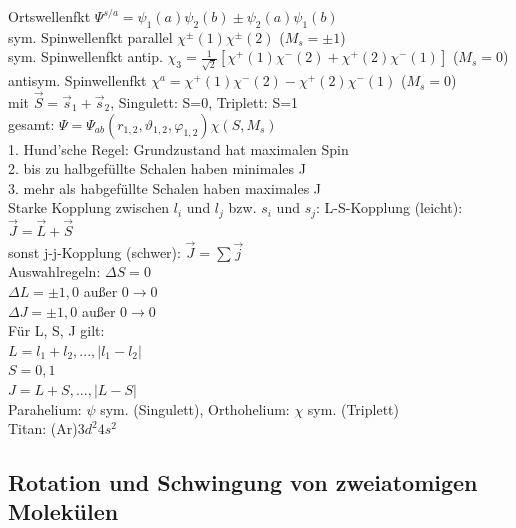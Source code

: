 \documentclass[12pt,a4paper]{article}
\renewcommand{\=}[1]{\stackrel{#1}{=}}
\theoremstyle{definition}
\theoremstyle{remark}
\begin{document}
Ortswellenfkt \dotfill $\Psi^{s/a} = \psi_1 (a) \psi_2(b) \pm \psi_2(a) \psi_1(b)$\\
sym. Spinwellenfkt parallel \dotfill $\chi^{\pm}(1) \chi^{\pm}(2)$ ($M_s = \pm 1$)\\
sym. Spinwellenfkt antip. \dotfill $ \chi_3 = \frac{1}{\sqrt{2}} [\chi^+ (1) \chi^- (2) + \chi^+ (2) \chi^- (1)]$ ($M_s = 0$)\\
antisym. Spinwellenfkt \dotfill $\chi^a = \chi^+ (1) \chi^- (2) - \chi^+ (2) \chi^- (1)$ ($M_s = 0$)\\
mit $\vec S = \vec s_1 + \vec s_2$, Singulett: S=0, Triplett: S=1\\
gesamt: $\Psi = \Psi_{ab}(r_{1,2}, \vartheta_{1,2}, \varphi_{1,2}) \chi(S,M_s)$\\
1. Hund'sche Regel: Grundzustand hat maximalen Spin\\
2. bis zu halbgefüllte Schalen haben minimales J\\
3. mehr als habgefüllte Schalen haben maximales J\\

Starke Kopplung zwischen $l_i$ und $l_j$ bzw. $s_i$ und $s_j$: L-S-Kopplung (leicht): $\vec J = \vec L + \vec S$\\
sonst j-j-Kopplung (schwer): $\vec J = \sum \vec j$\\
Auswahlregeln:
$\Delta S = 0$\\
$\Delta L = \pm 1, 0$ außer $0 \rightarrow 0$\\
$\Delta J = \pm 1, 0$ außer $0 \rightarrow 0$\\

Für L, S, J gilt:\\
$L = l_1 + l_2 , ..., |l_1 - l_2|$\\
$S = 0,1$\\
$J = L+S, ..., |L-S|$\\
Parahelium: $\psi$ sym. (Singulett), Orthohelium: $\chi$ sym. (Triplett)\\
Titan: (Ar)$3d^2 4s^2$

\subsection{Rotation und Schwingung von zweiatomigen Molekülen}
\end{document}
